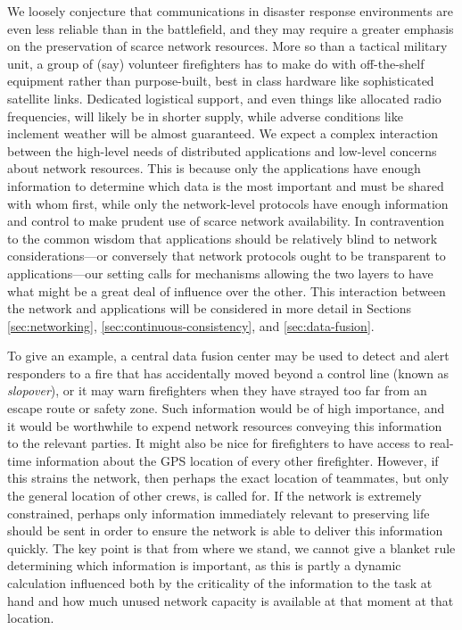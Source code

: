 \documentclass[]             %
{NASA}                       %
\theoremstyle{definition}
\begin{document}
We loosely conjecture that communications in disaster response
environments are even less reliable than in the battlefield, and they
may require a greater emphasis on the preservation of scarce network
resources. More so than a tactical military unit, a group of (say)
volunteer firefighters has to make do with off-the-shelf equipment
rather than purpose-built, best in class hardware like sophisticated
satellite links. Dedicated logistical support, and even things like
allocated radio frequencies, will likely be in shorter supply, while
adverse conditions like inclement weather will be almost
guaranteed. We expect a complex interaction between the high-level
needs of distributed applications and low-level concerns about network
resources. This is because only the applications have enough
information to determine which data is the most important and must be
shared with whom first, while only the network-level protocols have
enough information and control to make prudent use of scarce network
availability. In contravention to the common wisdom that applications
should be relatively blind to network considerations---or conversely
that network protocols ought to be transparent to applications---our
setting calls for mechanisms allowing the two layers to have what
might be a great deal of influence over the other. This interaction
between the network and applications will be considered in more detail
in Sections \ref{sec:networking}, \ref{sec:continuous-consistency},
and \ref{sec:data-fusion}.

To give an example, a central data fusion center may be used to detect
and alert responders to a fire that has accidentally moved beyond a
control line (known as \emph{slopover}), or it may warn firefighters
when they have strayed too far from an escape route or safety
zone. Such information would be of high importance, and it would be
worthwhile to expend network resources conveying this information to
the relevant parties. It might also be nice for firefighters to have
access to real-time information about the GPS location of every other
firefighter. However, if this strains the network, then perhaps the
exact location of teammates, but only the general location of other
crews, is called for. If the network is extremely constrained, perhaps
only information immediately relevant to preserving life should be
sent in order to ensure the network is able to deliver this
information quickly. The key point is that from where we stand, we
cannot give a blanket rule determining which information is important,
as this is partly a dynamic calculation influenced both by the
criticality of the information to the task at hand and how much unused
network capacity is available at that moment at that location.
\end{document}

